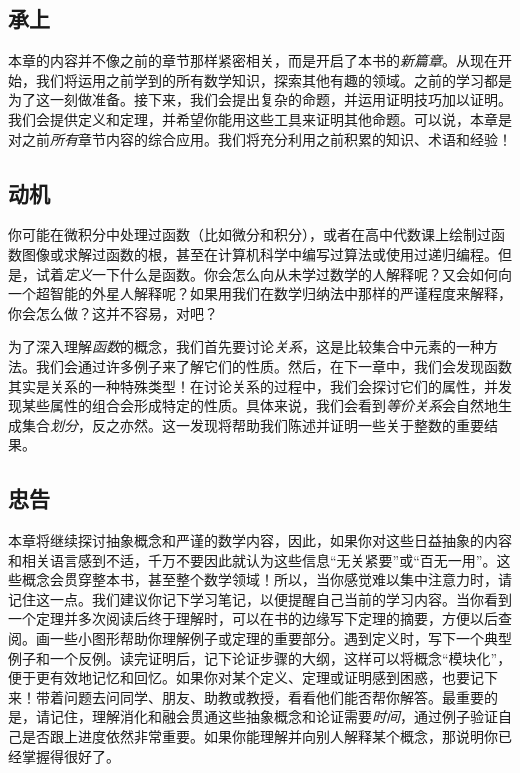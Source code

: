 \subsection{承上}

本章的内容并不像之前的章节那样紧密相关，而是开启了本书的\emph{新篇章}。从现在开始，我们将运用之前学到的所有数学知识，探索其他有趣的领域。之前的学习都是为了这一刻做准备。接下来，我们会提出复杂的命题，并运用证明技巧加以证明。我们会提供定义和定理，并希望你能用这些工具来证明其他命题。可以说，本章是对之前\emph{所有}章节内容的综合应用。我们将充分利用之前积累的知识、术语和经验！

\subsection{动机}

你可能在微积分中处理过函数（比如微分和积分），或者在高中代数课上绘制过函数图像或求解过函数的根，甚至在计算机科学中编写过算法或使用过递归编程。但是，试着\emph{定义}一下什么是函数。你会怎么向从未学过数学的人解释呢？又会如何向一个超智能的外星人解释呢？如果用我们在数学归纳法中那样的严谨程度来解释，你会怎么做？这并不容易，对吧？

为了深入理解\emph{函数}的概念，我们首先要讨论\emph{关系}，这是比较集合中元素的一种方法。我们会通过许多例子来了解它们的性质。然后，在下一章中，我们会发现函数其实是关系的一种特殊类型！在讨论关系的过程中，我们会探讨它们的属性，并发现某些属性的组合会形成特定的性质。具体来说，我们会看到\emph{等价关系}会自然地生成集合\emph{划分}，反之亦然。这一发现将帮助我们陈述并证明一些关于整数的重要结果。

\subsection{忠告}

本章将继续探讨抽象概念和严谨的数学内容，因此，如果你对这些日益抽象的内容和相关语言感到不适，千万不要因此就认为这些信息``无关紧要''或``百无一用''。这些概念会贯穿整本书，甚至整个数学领域！所以，当你感觉难以集中注意力时，请记住这一点。我们建议你记下学习笔记，以便提醒自己当前的学习内容。当你看到一个定理并多次阅读后终于理解时，可以在书的边缘写下定理的摘要，方便以后查阅。画一些小图形帮助你理解例子或定理的重要部分。遇到定义时，写下一个典型例子和一个反例。读完证明后，记下论证步骤的大纲，这样可以将概念``模块化''，便于更有效地记忆和回忆。如果你对某个定义、定理或证明感到困惑，也要记下来！带着问题去问同学、朋友、助教或教授，看看他们能否帮你解答。最重要的是，请记住，理解消化和融会贯通这些抽象概念和论证需要\emph{时间}，通过例子验证自己是否跟上进度依然非常重要。如果你能理解并向别人解释某个概念，那说明你已经掌握得很好了。